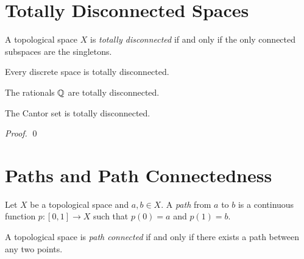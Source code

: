 \section{Totally Disconnected Spaces}

\begin{definition}
    A topological space $X$ is \emph{totally disconnected} if and only if the only connected subspaces are the singletons.
\end{definition}

\begin{example}
    Every discrete space is totally disconnected.
\end{example}

\begin{example}
    The rationals $\mathbb{Q}$ are totally disconnected.
\end{example}

\begin{example}
    The Cantor set is totally disconnected.
\end{example}

\begin{proof}
    \pf
    \qed
\end{proof}

\section{Paths and Path Connectedness}

\begin{definition}[Path]
    Let $X$ be a topological space and $a, b \in X$. A \emph{path} from $a$ to $b$ is a continuous function $p : [0,1] \rightarrow X$
    such that $p(0) = a$ and $p(1) = b$.
\end{definition}

\begin{definition}
    A topological space is \emph{path connected} if and only if there exists a path between any two points.
\end{definition}

